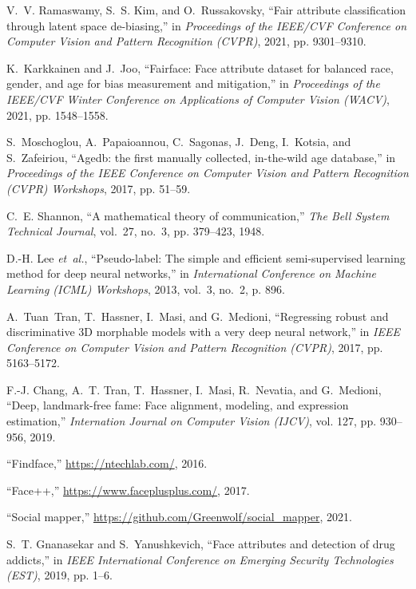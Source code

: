 \documentclass[journal]{IEEEtran}
\begin{document}
\begin{thebibliography}{100}
V.~V. Ramaswamy, S.~S. Kim, and O.~Russakovsky, ``Fair attribute classification through latent space de-biasing,'' in \emph{Proceedings of the IEEE/CVF Conference on Computer Vision and Pattern Recognition (CVPR)}, 2021, pp. 9301--9310.

K.~Karkkainen and J.~Joo, ``Fairface: Face attribute dataset for balanced race, gender, and age for bias measurement and mitigation,'' in \emph{Proceedings
of the IEEE/CVF Winter Conference on Applications of Computer Vision (WACV)}, 2021, pp. 1548--1558.

S.~Moschoglou, A.~Papaioannou, C.~Sagonas, J.~Deng, I.~Kotsia, and S.~Zafeiriou, ``Agedb: the first manually collected, in-the-wild age database,'' in \emph{Proceedings of the IEEE Conference on Computer Vision
and Pattern Recognition (CVPR) Workshops}, 2017, pp. 51--59.

C.~E. Shannon, ``A mathematical theory of communication,'' \emph{The Bell System Technical Journal}, vol.~27, no.~3, pp. 379--423, 1948.

D.-H. Lee \emph{et~al.}, ``Pseudo-label: The simple and efficient semi-supervised learning method for deep neural networks,'' in \emph{International
Conference on Machine Learning (ICML) Workshops}, 2013, vol.~3, no.~2, p. 896.

A.~Tuan~Tran, T.~Hassner, I.~Masi, and G.~Medioni, ``Regressing robust and discriminative 3D morphable models with a very deep neural network,'' in
\emph{IEEE Conference on Computer Vision and Pattern Recognition (CVPR)}, 2017, pp. 5163--5172.

F.-J. Chang, A.~T. Tran, T.~Hassner, I.~Masi, R.~Nevatia, and G.~Medioni, ``Deep, landmark-free fame: Face alignment, modeling, and expression estimation,'' \emph{Internation Journal on Computer Vision (IJCV)}, vol. 127, pp. 930--956, 2019.

``Findface,'' \url{https://ntechlab.com/}, 2016.

``Face++,'' \url{https://www.faceplusplus.com/}, 2017.

``Social mapper,'' \url{https://github.com/Greenwolf/social\_mapper}, 2021.

S.~T. Gnanasekar and S.~Yanushkevich, ``Face attributes and detection of drug addicts,'' in \emph{IEEE International Conference on Emerging Security
Technologies (EST)}, 2019, pp. 1--6.


\end{thebibliography}
\end{document}
